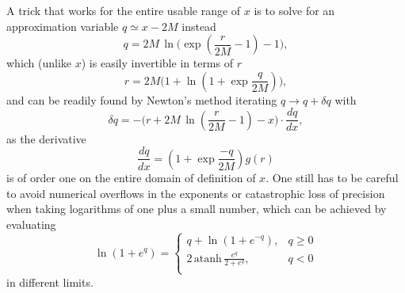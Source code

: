\documentclass[aps,prd,reprint,twocolumn,groupedaddress]{revtex4-1}
\begin{document}
A trick that works for the entire usable range of $x$ is to solve for an approximation variable $q \simeq x - 2M$ instead \begin{equation}
  q = 2M\, \ln\Bigg(\exp\left(\frac{r}{2M} - 1\right) - 1\Bigg),
\end{equation}
which (unlike $x$) is easily invertible in terms of $r$
\begin{equation}
  r = 2M \Bigg(1 + \ln\left(1+\exp\frac{q}{2M}\right)\Bigg),
\end{equation}
and can be readily found by Newton's method iterating $q \rightarrow q + \delta q$ with
\begin{equation}
  \delta q = -\Bigg(r + 2M\,\ln\left(\frac{r}{2M} - 1\right) - x\Bigg) \cdot \frac{dq}{dx},
\end{equation}
as the derivative
\begin{equation}
  \frac{dq}{dx} = \left(1+\exp\frac{-q}{2M}\right) g(r)
\end{equation}
is of order one on the entire domain of definition of $x$. One still has to be careful to avoid numerical overflows in the exponents or catastrophic loss of precision when taking logarithms of one plus a small number, which can be achieved by evaluating 
\begin{equation}
  \ln\left(1+e^q\right) = \left\{ \begin{array}{rr}
    q + \ln\left(1 + e^{-q}\right),& q \ge 0\\
    2\, \text{atanh}\, {\displaystyle\frac{e^q}{2+e^q}},& q < 0\\
  \end{array} \right.
\end{equation}
in different limits.


\end{document}
